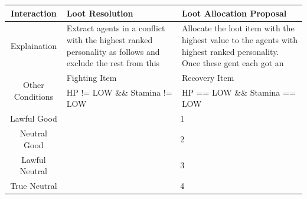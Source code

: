 \begin{table}[h!]
    \centering
    \small
    \begin{tabular}{ |c|p{16em}|p{16em}| }
        \hline
        Interaction                       & Loot Resolution                                                                                            & Loot Allocation Proposal                                                                                                 \\
        \hline
        Explaination                      & Extract agents in a conflict with the highest ranked personality as follows and exclude the rest from this & Allocate the loot item with the highest value to the agents with highest ranked personality. Once these gent each got an \\
        \hline
        \multirow{2}{*}{Other Conditions} & Fighting Item                                                                                              & Recovery Item                                                                                                            \\
        \cline{2-3}
                                          & HP != LOW \&\& Stamina != LOW                                                                              & HP == LOW \&\& Stamina == LOW                                                                                            \\
        \hline
        Lawful Good                       & \multicolumn{2}{c|}{1}                                                                                                                                                                                                                \\
        \hline
        Neutral Good                      & \multicolumn{2}{c|}{2}                                                                                                                                                                                                                \\
        \hline
        Lawful Neutral                    & \multicolumn{2}{c|}{3}                                                                                                                                                                                                                \\
        \hline
        True Neutral                      & \multicolumn{2}{c|}{4}                                                                                                                                                                                                                \\

\end{tabular}
\end{table}
